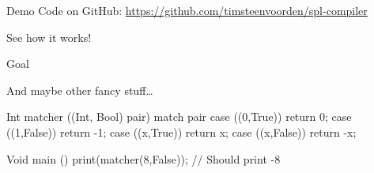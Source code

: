 \begin{frame}{Demo}
  Code on GitHub: \url{https://github.com/timsteenvoorden/spl-compiler}

  \bigskip

  See how it works!
\end{frame}

\appendix

\begin{frame}[fragile]{Goal}

  And maybe other fancy stuff\dots

    \begin{code}
      Int matcher ((Int, Bool) pair) {
        match pair
        case ((0,True))
          return 0;
        case ((1,False))
          return -1;
        case ((x,True))
          return x;
        case ((x,False))
          return -x;
      }

      Void main () {
        print(matcher(8,False));    // Should print -8
      }
    \end{code}

\end{frame}




